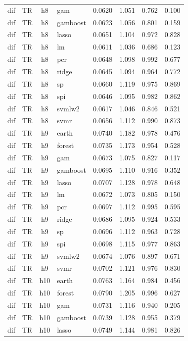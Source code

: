 \begin{ThreePartTable}
\begin{longtable}[t]{llclcccc}
dif & TR & h8 & gam & 0.0620 & 1.051 & 0.762 & 0.100\\
dif & TR & h8 & gamboost & 0.0623 & 1.056 & 0.801 & 0.159\\
dif & TR & h8 & lasso & 0.0651 & 1.104 & 0.972 & 0.828\\
dif & TR & h8 & lm & 0.0611 & 1.036 & 0.686 & 0.123\\
dif & TR & h8 & pcr & 0.0648 & 1.098 & 0.992 & 0.677\\
dif & TR & h8 & ridge & 0.0645 & 1.094 & 0.964 & 0.772\\
dif & TR & h8 & sp & 0.0660 & 1.119 & 0.975 & 0.869\\
dif & TR & h8 & spi & 0.0646 & 1.095 & 0.982 & 0.862\\
dif & TR & h8 & svmlw2 & 0.0617 & 1.046 & 0.846 & 0.521\\
dif & TR & h8 & svmr & 0.0656 & 1.112 & 0.990 & 0.873\\
\addlinespace
dif & TR & h9 & earth & 0.0740 & 1.182 & 0.978 & 0.476\\
dif & TR & h9 & forest & 0.0735 & 1.173 & 0.954 & 0.528\\
dif & TR & h9 & gam & 0.0673 & 1.075 & 0.827 & 0.117\\
dif & TR & h9 & gamboost & 0.0695 & 1.110 & 0.916 & 0.352\\
dif & TR & h9 & lasso & 0.0707 & 1.128 & 0.978 & 0.648\\
dif & TR & h9 & lm & 0.0672 & 1.073 & 0.805 & 0.150\\
dif & TR & h9 & pcr & 0.0697 & 1.112 & 0.995 & 0.595\\
dif & TR & h9 & ridge & 0.0686 & 1.095 & 0.924 & 0.533\\
dif & TR & h9 & sp & 0.0696 & 1.112 & 0.963 & 0.728\\
dif & TR & h9 & spi & 0.0698 & 1.115 & 0.977 & 0.863\\
dif & TR & h9 & svmlw2 & 0.0674 & 1.076 & 0.897 & 0.671\\
dif & TR & h9 & svmr & 0.0702 & 1.121 & 0.976 & 0.830\\
\addlinespace
dif & TR & h10 & earth & 0.0763 & 1.164 & 0.984 & 0.456\\
dif & TR & h10 & forest & 0.0790 & 1.205 & 0.996 & 0.627\\
dif & TR & h10 & gam & 0.0731 & 1.116 & 0.940 & 0.205\\
dif & TR & h10 & gamboost & 0.0739 & 1.128 & 0.955 & 0.379\\
dif & TR & h10 & lasso & 0.0749 & 1.144 & 0.981 & 0.826\\

\end{longtable}
\end{ThreePartTable}
